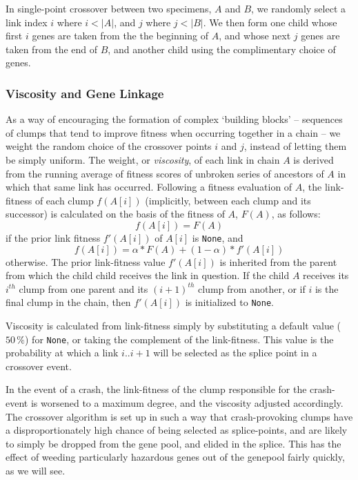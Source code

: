 In single-point crossover between two specimens, $A$ and $B$, we
randomly select a link index $i$ where $i < |A|$, and $j$ where $j
< |B|$. We then form one child whose first $i$ genes are taken
from the the beginning of $A$, and whose next $j$ genes are taken
from the end of $B$, and another child using the complimentary
choice of genes. 

\subsubsection{Viscosity and Gene Linkage}
As a way of encouraging the formation of complex `building
blocks' -- sequences of clumps that tend to improve fitness when
occurring together in a chain -- we weight the random choice of
the crossover points $i$ and $j$, instead of letting them be
simply uniform. The weight, or \emph{viscosity}, of each
link in chain $A$ is derived from the running average of fitness
scores of unbroken series of ancestors of $A$ in which that same link
has occurred. Following a fitness evaluation of $A$, the
link-fitness of each clump $f(A[i])$ (implicitly, between each
clump and its successor) is calculated on the basis of the
fitness of $A$, $F(A)$, as follows: 
  $$ f(A[i]) = F(A)$$
if the prior link fitness $f'(A[i])$ of $A[i]$ is \texttt{None},
and 
  $$ f(A[i]) = \alpha * F(A) + (1-\alpha) * f'(A[i]) $$
otherwise. The prior link-fitness value $f'(A[i])$ is inherited
from the parent from which the child child receives the link in
question. If the child $A$ receives its $i^{th}$ clump from one
parent and its $(i+1)^{th}$ clump from another, or if $i$ is the
final clump in the chain, then $f'(A[i])$ is initialized to
\texttt{None}.

Viscosity is calculated from link-fitness simply by substituting
a default value ($50\,\%$) for \texttt{None}, or taking the
complement of the link-fitness. This value is the probability at
which a link $i..i+1$ will be selected as the splice point in a
crossover event. 

In the event of a crash, the link-fitness of the clump
responsible for the crash-event is worsened to a maximum degree,
and the viscosity adjusted accordingly. The crossover algorithm
is set up in such a way that crash-provoking clumps have a
disproportionately high chance of being selected as
splice-points, and are likely to simply be dropped from the gene
pool, and elided in the splice. This has the effect of weeding
particularly hazardous genes out of the genepool fairly quickly,
as we will see. 

